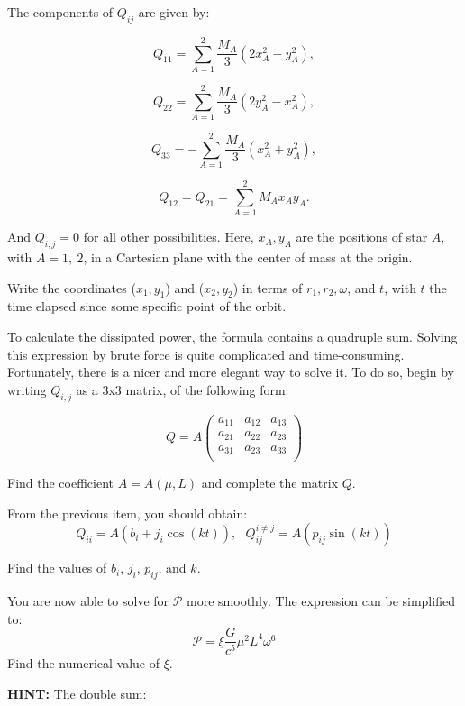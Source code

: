 \documentclass[11pt]{article}
\begin{document}
\begin{pproblem}
\begin{alternativas}
    The components of \( Q_{ij} \) are given by:

    \[
    Q_{11} = \sum_{A=1}^2 \frac{M_A}{3} \left( 2x_A^2 - y_A^2 \right),
    \]

    \[
    Q_{22} = \sum_{A=1}^2 \frac{M_A}{3} \left( 2y_A^2 - x_A^2 \right),
    \]

    \[
    Q_{33} = -\sum_{A=1}^2 \frac{M_A}{3} \left( x_A^2 + y_A^2 \right),
    \]

    \[
    Q_{12} = Q_{21} = \sum_{A=1}^2 M_A x_A y_A.
    \]

    And \(Q_{i,j} = 0\) for all other possibilities. Here, \(x_A, y_A\) are the positions of star \(A\), with \(A=1,\ 2\), in a Cartesian plane with the center of mass at the origin.

    \item Write the coordinates (\(x_1, y_1\)) and (\(x_2, y_2\)) in terms of \(r_1, r_2, \omega\), and \(t\), with \(t\) the time elapsed since some specific point of the orbit.
    
    \item To calculate the dissipated power, the formula contains a quadruple sum. Solving this expression by brute force is quite complicated and time-consuming. Fortunately, there is a nicer and more elegant way to solve it. To do so, begin by writing \(Q_{i,j}\) as a 3x3 matrix, of the following form:
    
    \[Q = A\left(\begin{matrix}
        a_{11} & a_{12} & a_{13} \\
        a_{21} & a_{22} & a_{23} \\
        a_{31} & a_{23} & a_{33} \\
    \end{matrix}\right)\]

    Find the coefficient \(A = A(\mu, L)\) and complete the matrix \(Q\).

    \item From the previous item, you should obtain:
    \[Q_{ii} = A(b_i + j_i\cos(k t)), \ \ \ Q_{ij}^{i\neq j}= A(p_{ij} \sin(kt)) \]

    Find the values of \(b_i\), \(j_i\), \(p_{ij}\), and \(k\).

    \item You are now able to solve for \(\mathcal{P}\) more smoothly. The expression can be simplified to:
    \[\mathcal{P} = \xi \frac{G}{c^5}\mu^2L^4\omega^6\]
    Find the numerical value of \(\xi\).

    \textbf{HINT: } The double sum:


\end{alternativas}
\end{pproblem}
\end{document}
